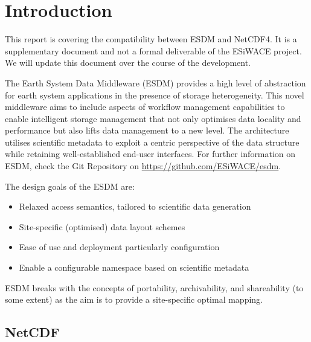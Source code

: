 \chapter{Introduction}
\label{ch:intro}

This report is covering the compatibility between ESDM and NetCDF4.
It is a supplementary document and not a formal deliverable of the ESiWACE project.
We will update this document over the course of the development.

The Earth System Data Middleware (ESDM) provides a high level of abstraction for earth system applications in the presence of storage heterogeneity.
This novel middleware aims to include aspects of workflow management capabilities to enable intelligent storage management that not only optimises data locality and performance but also lifts data management to a new level.
The architecture utilises scientific metadata to exploit a centric perspective of the data structure while retaining well-established end-user interfaces.
For further information on ESDM, check the Git Repository on \url{https://github.com/ESiWACE/esdm}.

The design goals of the ESDM are:

\begin{itemize}

\item Relaxed access semantics, tailored to scientific data generation

\item Site-specific (optimised) data layout schemes

\item Ease of use and deployment particularly configuration

\item Enable a configurable namespace based on scientific metadata

\end{itemize}

ESDM breaks with the concepts of portability, archivability, and shareability (to some extent) as the aim is to provide a site-specific optimal mapping.

\section{NetCDF}

